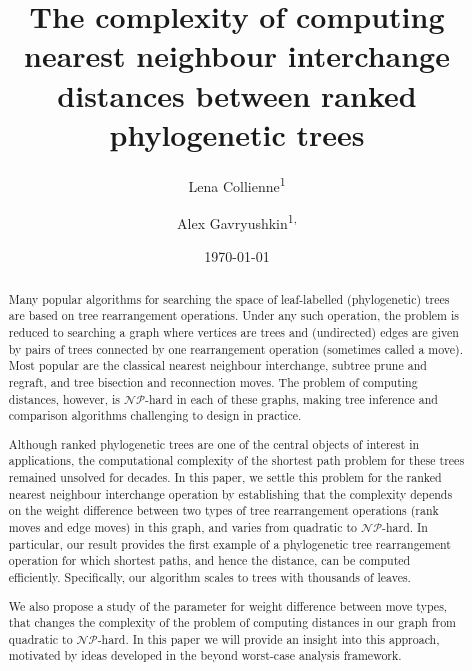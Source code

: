 \documentclass[11pt]{amsart}
\title[Computing $\rnni$ distance]{The complexity of computing nearest neighbour interchange distances between ranked phylogenetic trees}
\date{\today}
\author{Lena Collienne\textsuperscript{1}}
\author{Alex Gavryushkin\textsuperscript{1, \Letter}}
\newcommand{\np}{\mathcal{NP}}
\begin{document}
\begin{abstract}
Many popular algorithms for searching the space of leaf-labelled (phylogenetic) trees are based on tree rearrangement operations.
Under any such operation, the problem is reduced to searching a graph where vertices are trees and (undirected) edges are given by pairs of trees connected by one rearrangement operation (sometimes called a move).
Most popular are the classical nearest neighbour interchange, subtree prune and regraft, and tree bisection and reconnection moves.
The problem of computing distances, however, is $\np$-hard in each of these graphs, making tree inference and comparison algorithms challenging to design in practice.

Although ranked phylogenetic trees are one of the central objects of interest in applications, the computational complexity of the shortest path problem for these trees remained unsolved for decades.
In this paper, we settle this problem for the ranked nearest neighbour interchange operation by establishing that the complexity depends on the weight difference between two types of tree rearrangement operations (rank moves and edge moves) in this graph, and varies from quadratic to $\np$-hard.
In particular, our result provides the first example of a phylogenetic tree rearrangement operation for which shortest paths, and hence the distance, can be computed efficiently.
Specifically, our algorithm scales to trees with thousands of leaves.

We also propose a study of the parameter for weight difference between move types, that changes the complexity of the problem of computing distances in our graph from quadratic to $\np$-hard.
In this paper we will provide an insight into this approach, motivated by ideas developed in the beyond worst-case analysis framework.
\end{abstract}


\maketitle
\thispagestyle{empty}

\newpage

\setcounter{page}{1}
\end{document}
